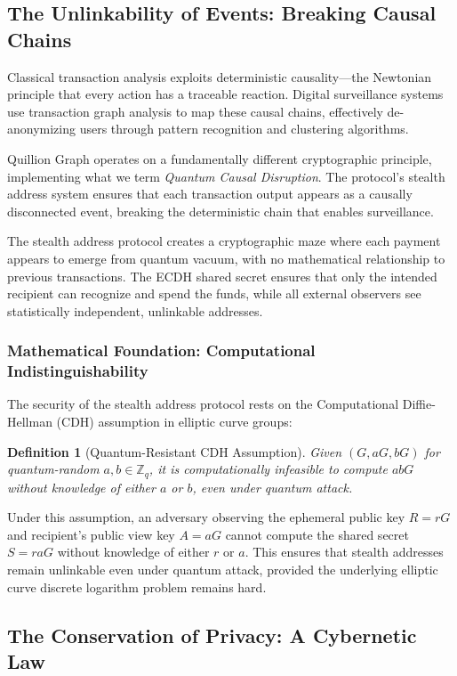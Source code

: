 \documentclass[12pt,a4paper]{article}
\newtheorem{definition}[theorem]{Definition}
\begin{document}
\subsection{The Unlinkability of Events: Breaking Causal Chains}

Classical transaction analysis exploits deterministic causality—the Newtonian principle that every action has a traceable reaction. Digital surveillance systems use transaction graph analysis to map these causal chains, effectively de-anonymizing users through pattern recognition and clustering algorithms.

Quillion Graph operates on a fundamentally different cryptographic principle, implementing what we term \textit{Quantum Causal Disruption}. The protocol's stealth address system ensures that each transaction output appears as a causally disconnected event, breaking the deterministic chain that enables surveillance.

The stealth address protocol creates a cryptographic maze where each payment appears to emerge from quantum vacuum, with no mathematical relationship to previous transactions. The ECDH shared secret ensures that only the intended recipient can recognize and spend the funds, while all external observers see statistically independent, unlinkable addresses.

\subsubsection{Mathematical Foundation: Computational Indistinguishability}

The security of the stealth address protocol rests on the Computational Diffie-Hellman (CDH) assumption in elliptic curve groups:

\begin{definition}[Quantum-Resistant CDH Assumption]
Given $(G, aG, bG)$ for quantum-random $a, b \in \mathbb{Z}_q$, it is computationally infeasible to compute $abG$ without knowledge of either $a$ or $b$, even under quantum attack.
\end{definition}

Under this assumption, an adversary observing the ephemeral public key $R = rG$ and recipient's public view key $A = aG$ cannot compute the shared secret $S = raG$ without knowledge of either $r$ or $a$. This ensures that stealth addresses remain unlinkable even under quantum attack, provided the underlying elliptic curve discrete logarithm problem remains hard.

\subsection{The Conservation of Privacy: A Cybernetic Law}
\end{document}

